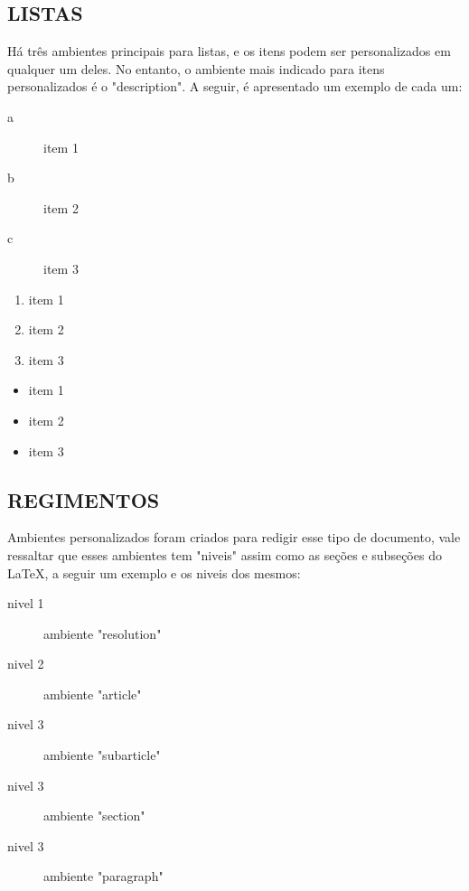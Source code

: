
\subsection{LISTAS}

Há três ambientes principais para listas, e os itens podem ser personalizados em qualquer um deles. No entanto, o ambiente mais indicado para itens personalizados é o "description". A seguir, é apresentado um exemplo de cada um:

\begin{description}
    \item[a] item 1

    \item[b] item 2

    \item[c] item 3
\end{description}

\begin{enumerate}
    \item item 1

    \item item 2

    \item item 3
\end{enumerate}

\begin{itemize}
    \item item 1

    \item item 2

    \item item 3
\end{itemize}

\subsection{REGIMENTOS}

Ambientes personalizados foram criados para redigir esse tipo de documento, vale ressaltar que esses ambientes tem "niveis" assim como as seções e subseções do \LaTeX, a seguir um exemplo e os niveis dos mesmos:

\begin{description}
    \item[nivel 1] ambiente "resolution"

    \item[nivel 2] ambiente "article"

    \item[nivel 3] ambiente "subarticle"

    \item[nivel 3] ambiente "section"

    \item[nivel 3] ambiente "paragraph"
\end{description}

